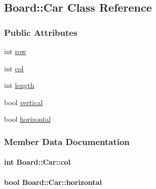 \hypertarget{class_board_1_1_car}{}\subsection{Board\+:\+:Car Class Reference}
\label{class_board_1_1_car}
\subsubsection*{Public Attributes}
\begin{DoxyCompactItemize}
\item 
int \hyperlink{class_board_1_1_car_a7bb2575a11bc3119c4d036d469d79454}{row}
\item 
int \hyperlink{class_board_1_1_car_ac32850c771bc009b24068716ef797267}{col}
\item 
int \hyperlink{class_board_1_1_car_a64a2c8d3024790015f07d48fe066ce55}{length}
\item 
bool \hyperlink{class_board_1_1_car_ac9e9100e7f43bcedee740d5840aefb6f}{vertical}
\item 
bool \hyperlink{class_board_1_1_car_a830e4ed990c845a6672fe3cd6e3b150f}{horizontal}
\end{DoxyCompactItemize}


\subsubsection{Member Data Documentation}
\paragraph[{\texorpdfstring{col}{col}}]{\setlength{\rightskip}{0pt plus 5cm}int Board\+::\+Car\+::col}\hypertarget{class_board_1_1_car_ac32850c771bc009b24068716ef797267}{}\label{class_board_1_1_car_ac32850c771bc009b24068716ef797267}
\paragraph[{\texorpdfstring{horizontal}{horizontal}}]{\setlength{\rightskip}{0pt plus 5cm}bool Board\+::\+Car\+::horizontal}\hypertarget{class_board_1_1_car_a830e4ed990c845a6672fe3cd6e3b150f}{}\label{class_board_1_1_car_a830e4ed990c845a6672fe3cd6e3b150f}
